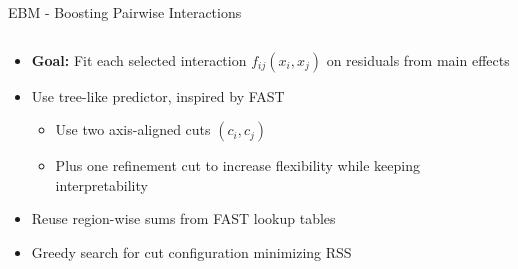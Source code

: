 \documentclass[11pt,compress,t,notes=noshow, aspectratio=169, xcolor=table]{beamer}
\begin{document}
\begin{frame}{EBM - Boosting Pairwise Interactions}
\begin{columns}[c, totalwidth=\textwidth]
    \begin{column}{0.67\textwidth}
        \begin{itemize}
            \item \textbf{Goal:} Fit each selected interaction $f_{ij}(x_i, x_j)$ on residuals from main effects
            \item Use tree-like predictor, inspired by FAST
            \begin{itemize}
                \item Use two axis-aligned cuts $(c_i, c_j)$ 
                \item Plus one refinement cut to increase flexibility while keeping interpretability
            \end{itemize}
            \item Reuse region-wise sums from FAST lookup tables
            \item Greedy search for cut configuration minimizing RSS
        \end{itemize}
    \end{column}
\end{columns}
\end{frame}



\end{document}
